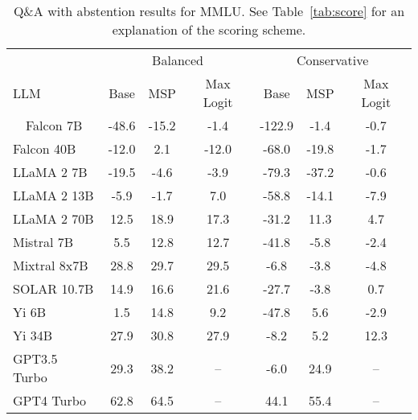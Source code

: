 \begin{table*}[h]
\centering
\caption{Q\&A with abstention results for MMLU. See Table~\ref{tab:score} for an explanation of the scoring scheme.}
\label{tab:mmlu_score}
\begin{tabular}{lcccccc}
\toprule
& \multicolumn{3}{c}{Balanced} & \multicolumn{3}{c}{Conservative} \\ 
LLM & Base & MSP & Max Logit & Base & MSP & Max Logit \\ 
\cmidrule(lr){1-1}\cmidrule(lr){2-4}\cmidrule(lr){5-7}\ \ 
Falcon 7B & -48.6 & -15.2 & -1.4 & -122.9 & -1.4 & -0.7\\
Falcon 40B & -12.0 & 2.1 & -12.0 & -68.0 & -19.8 & -1.7\\
LLaMA 2 7B & -19.5 & -4.6 & -3.9 & -79.3 & -37.2 & -0.6\\
LLaMA 2 13B & -5.9 & -1.7 & 7.0 & -58.8 & -14.1 & -7.9\\
LLaMA 2 70B & 12.5 & 18.9 & 17.3 & -31.2 & 11.3 & 4.7\\
Mistral 7B & 5.5 & 12.8 & 12.7 & -41.8 & -5.8 & -2.4\\
Mixtral 8x7B & 28.8 & 29.7 & 29.5 & -6.8 & -3.8 & -4.8\\
SOLAR 10.7B & 14.9 & 16.6 & 21.6 & -27.7 & -3.8 & 0.7\\
Yi 6B & 1.5 & 14.8 & 9.2 & -47.8 & 5.6 & -2.9\\
Yi 34B & 27.9 & 30.8 & 27.9 & -8.2 & 5.2 & 12.3\\
GPT3.5 Turbo & 29.3 & 38.2 & -- & -6.0 & 24.9 & --\\
GPT4 Turbo & 62.8 & 64.5 & -- & 44.1 & 55.4 & --\\
\bottomrule
\end{tabular}
\end{table*}
